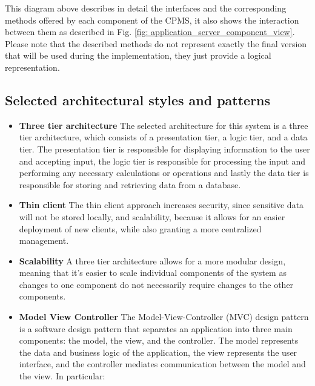 \documentclass[table, 12pt]{article}
\begin{document}
This diagram above describes in detail the interfaces and the corresponding methods offered by each component of the CPMS, it also shows the interaction between them as described in Fig. \ref*{fig: application_server_component_view}.\\
Please note that the described methods do not represent exactly the final version that will be used during the implementation, they just provide a logical representation.
\newpage

\subsection{Selected architectural styles and patterns}

    \begin{itemize}
        \item \textbf{Three tier architecture} \newline
        The selected architecture for this system is a three tier architecture, which consists of a presentation tier, a logic tier, and a data tier. The presentation tier is responsible for displaying information to the user and accepting input, the logic tier is responsible for processing the input and performing any necessary calculations or operations and lastly the data tier is responsible for storing and retrieving data from a database.
        \item \textbf{Thin client} \newline
              The thin client approach increases security, since sensitive data will not be stored locally, and scalability, because it allows for an easier deployment of new clients, while also granting a more centralized management.
        \item \textbf{Scalability} \newline
              A three tier architecture allows for a more modular design, meaning that it's easier to scale individual components of the system as changes to one component do not necessarily require changes to the other components.
        \item \textbf{Model View Controller} \newline
        The Model-View-Controller (MVC) design pattern is a software design pattern that separates an application into three main components: the model, the view, and the controller. The model represents the data and business logic of the application, the view represents the user interface, and the controller mediates communication between the model and the view. In particular:

\end{itemize}
\end{document}
